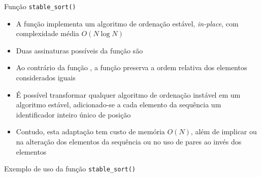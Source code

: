 \begin{frame}[fragile]{Função \texttt{stable\_sort()}}

    \begin{itemize}

        \item A função  implementa um algoritmo de ordenação estável,
            \textit{in-place}, com complexidade média $O(N\log N)$
        
        \item Duas assinaturas possíveis da função  são

        \item Ao contrário da função , a função 
            preserva a ordem relativa dos elementos considerados iguais

        \item É possível transformar qualquer algoritmo de ordenação instável em um algoritmo
            estável, adicionado-se a cada elemento da sequência um identificador inteiro 
            único de posição 

        \item Contudo, esta adaptação tem custo de memória $O(N)$, além de implicar ou na 
            alteração dos elementos da sequência ou no uso de pares ao invés dos elementos
    \end{itemize}

\end{frame}

\begin{frame}[fragile]{Exemplo de uso da função \texttt{stable\_sort()}}
\end{frame}

